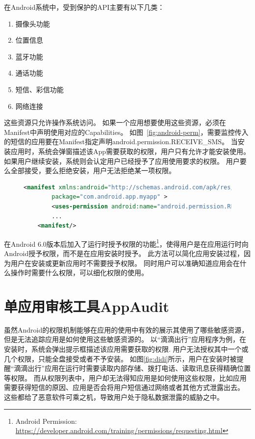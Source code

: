 在Android系统中，受到保护的API主要有以下几类：

\begin{enumerate}
	\item 摄像头功能
	\item 位置信息
	\item 蓝牙功能
	\item 通话功能
	\item 短信、彩信功能
	\item 网络连接
\end{enumerate}


这些资源只允许操作系统访问。
如果一个应用想要使用这些资源，必须在Manifest中声明使用对应的Capabilities。
如图~\ref{fig:android-perm}，需要监控传入的短信的应用要在Manifest指定声明android.permission.RECEIVE\_SMS。
当安装应用时，系统会弹窗描述该App需要获取的权限，用户只有允许才能安装使用。
如果用户继续安装，系统则会认定用户已经授予了应用使用要求的权限。
用户要么全部接受，要么拒绝安装，用户无法拒绝某一项权限。

\begin{figure}
	\centering
	\begin{lstlisting}[language={xml}]
	<manifest xmlns:android="http://schemas.android.com/apk/res/android"
		package="com.android.app.myapp" >
		<uses-permission android:name="android.permission.RECEIVE_SMS" />
		...
	<manifest/>
	\end{lstlisting}
\end{figure}

在Android 6.0版本后加入了运行时授予权限的功能\footnote{Android Permission: \url{https://developer.android.com/training/permissions/requesting.html}}，使得用户是在应用运行时向Android授予权限，而不是在应用安装时授予。
此方法可以简化应用安装过程，因为用户在安装或更新应用时不需要授予权限。
同时用户可以准确知道应用会在什么操作时需要什么权限，可以细化权限的使用。

\section{单应用审核工具AppAudit}
\label{sec:background-appaudit}

虽然Android的权限机制能够在应用的使用中有效的展示其使用了哪些敏感资源，但是无法追踪应用是如何使用这些敏感资源的。
以“滴滴出行”应用程序为例，在安装时，系统会弹出提示框描述该应用需要获取的权限.
用户无法授权其中一个或几个权限，只能全盘接受或者不予安装。
如图\ref{fig:didi}所示，用户在安装时被提醒“滴滴出行”应用在运行时需要读取内部存储、拨打电话、读取讯息获得精确位置等权限。
而从权限列表中，用户却无法得知应用是如何使用这些权限，比如应用需要获得短信的原因、应用是否会将用户短信通过网络或者其他方式泄露出去。
这些都给了恶意软件可乘之机，导致用户处于隐私数据泄露的威胁之中。

